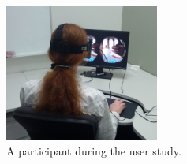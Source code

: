



\begin{figure}[h]
        \centering
            \includegraphics[width=0.45\textwidth]{images/participantv2.jpg}
            \caption{A participant during the user study.}
            \label{fig:user}
\end{figure}

